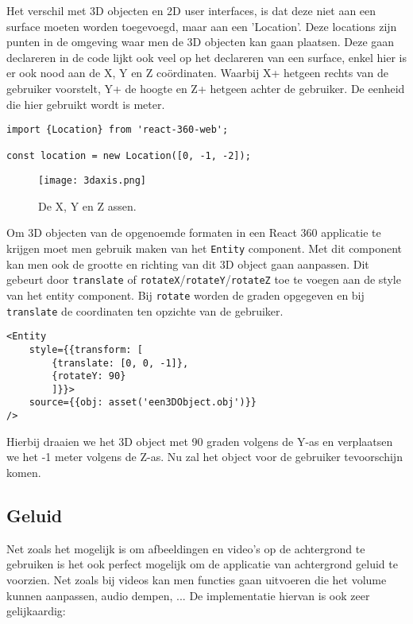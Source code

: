 Het verschil met 3D objecten en 2D user interfaces, is dat deze niet aan een surface moeten worden toegevoegd, maar aan een 'Location'. Deze locations zijn  punten in de omgeving waar men de 3D objecten kan gaan plaatsen. Deze gaan declareren in de code lijkt ook veel op het declareren van een surface, enkel hier is er ook nood aan de X, Y en Z coördinaten. Waarbij X+ hetgeen rechts van de gebruiker voorstelt, Y+ de hoogte en Z+ hetgeen achter de gebruiker. De eenheid die hier gebruikt wordt is meter.

\begin{lstlisting}[frame=single, caption=Voorbeeld van een location]
import {Location} from 'react-360-web';

const location = new Location([0, -1, -2]);
\end{lstlisting}

\begin{figure}[H]
	\centering
	\texttt{[image: 3daxis.png]}
	\caption{De X, Y en Z assen.}
	\label{fig:xyz-axis}
\end{figure}

Om 3D objecten van de opgenoemde formaten in een React 360 applicatie te krijgen moet men gebruik maken van het \lstinline[basicstyle=\ttfamily\color{red}]|Entity| component. Met dit component kan men ook de grootte en richting van dit 3D object gaan aanpassen. Dit gebeurt door \lstinline[basicstyle=\ttfamily\color{red}]|translate| of \lstinline[basicstyle=\ttfamily\color{red}]|rotateX|/\lstinline[basicstyle=\ttfamily\color{red}]|rotateY|/\lstinline[basicstyle=\ttfamily\color{red}]|rotateZ| toe te voegen aan de style van het entity component. Bij \lstinline[basicstyle=\ttfamily\color{red}]|rotate| worden de graden opgegeven en bij \lstinline[basicstyle=\ttfamily\color{red}]|translate| de coordinaten ten opzichte van de gebruiker.

\begin{lstlisting}[frame=single, caption=Voorbeeld van een Entity component]
<Entity 
	style={{transform: [
		{translate: [0, 0, -1]},
		{rotateY: 90}
		]}}>
	source={{obj: asset('een3DObject.obj')}}
/>
\end{lstlisting}

Hierbij draaien we het 3D object met 90 graden volgens de Y-as en verplaatsen we het -1 meter volgens de Z-as. Nu zal het object voor de gebruiker tevoorschijn komen.

\subsection{Geluid}
\label{subsec:Geluid}
Net zoals het mogelijk is om afbeeldingen en video's op de achtergrond te gebruiken is het ook perfect mogelijk om de applicatie van achtergrond geluid te voorzien. Net zoals bij videos kan men functies gaan uitvoeren die het volume kunnen aanpassen, audio dempen, ... De implementatie hiervan is ook zeer gelijkaardig:

